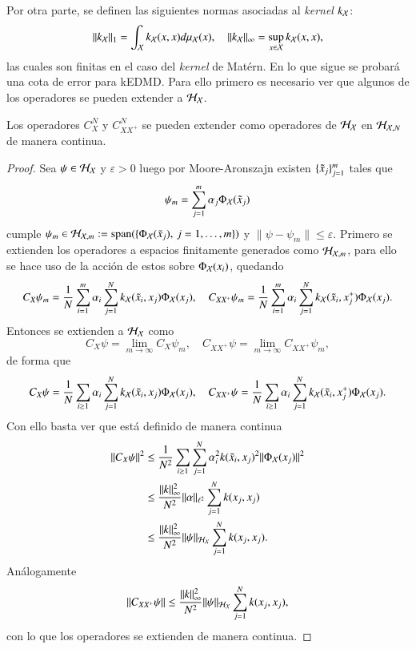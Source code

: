 Por otra parte, se definen las siguientes normas asociadas al \textit{kernel} \( k_{\mathcal{X}} \):
\begin{equation*}
    \| k_{\mathcal{X}} \|_1 = \int_{\mathcal{X}} k_{\mathcal{X}} (x,x) d \mu_{\mathcal{X}} (x), \quad \| k_{\mathcal{X}} \|_\infty = \sup_{x \in \mathcal{X}} k_{\mathcal{X}} (x,x),
\end{equation*}
las cuales son finitas en el caso del \textit{kernel} de Matérn. En lo que sigue se probará una cota de error para kEDMD. Para ello primero es necesario ver que algunos de los operadores se pueden extender a $\mathcal{H}_{\mathcal{X}}$.

\begin{prop}
    Los operadores $C_X^N$ y $C_{XX^+}^N$ se pueden extender como operadores de $\mathcal{H}_{\mathcal{X}}$ en $ \mathcal{H}_{\mathcal{X}, N}$ de manera continua.
\end{prop}

\begin{proof}
    Sea $\psi \in \mathcal{H}_{\mathcal{X}}$ y $\varepsilon > 0$ luego por Moore-Aronszajn existen $\{ \Tilde{x}_j \}_{j=1}^m$ tales que
    \[
    \psi_m = \sum_{j=1}^m \alpha_j \Phi_{\mathcal{X}} (\Tilde{x}_j)
    \]
    cumple $\psi_m \in \mathcal{H}_{\mathcal{X}, m} := \text{span}(\{ \Phi_{\mathcal{X}} (\Tilde{x}_j), \, j=1,\dots,m \})$ y $\| \psi - \psi_m \| \leq \varepsilon$. Primero se extienden los operadores a espacios finitamente generados como $\mathcal{H}_{\mathcal{X}, m}$, para ello se hace uso de la acción de estos sobre $\Phi_{\mathcal{X}} (x_i)$, quedando
    \[
    C_X \psi_m =
    \frac{1}{N} \sum_{i=1}^m \alpha_i \sum_{j = 1}^N k_{\mathcal{X}}(\Tilde{x}_i, x_j) \Phi_{\mathcal{X}} (x_j), \quad C_{XX^+} \psi_m =
    \frac{1}{N} \sum_{i=1}^m \alpha_i \sum_{j = 1}^N k_{\mathcal{X}}(\Tilde{x}_i, x_j^+) \Phi_{\mathcal{X}} (x_j).
    \]
    Entonces se extienden a $\mathcal{H}_{\mathcal{X}}$ como
    \[
    C_X \psi = \lim_{m \to \infty} C_X \psi_m, \quad C_{XX^+} \psi = \lim_{m \to \infty} C_{XX^+} \psi_m,
    \]
    de forma que
    \[
    C_X \psi =
    \frac{1}{N} \sum_{i \geq 1} \alpha_i \sum_{j = 1}^N k_{\mathcal{X}}(\Tilde{x}_i, x_j) \Phi_{\mathcal{X}} (x_j), \quad C_{XX^+} \psi =
    \frac{1}{N} \sum_{i \geq 1} \alpha_i \sum_{j = 1}^N k_{\mathcal{X}}(\Tilde{x}_i, x_j^+) \Phi_{\mathcal{X}} (x_j).
    \]
    Con ello basta ver que está definido de manera continua
    \[
    \begin{aligned}
        \| C_X \psi \|^2 & \leq \frac{1}{N^2} \sum_{i \geq 1} \sum_{j=1}^N \alpha_i^2 k(\Tilde{x}_i, x_j)^2 \| \Phi_{\mathcal{X}} (x_j) \|^2 \\
        & \leq \frac{\| k \|_\infty^2}{N^2} \| \alpha \|_{\ell^2} \sum_{j=1}^N k(x_j, x_j) \\
        & \leq \frac{\| k \|_\infty^2}{N^2} \| \psi \|_{\mathcal{H}_{\mathcal{X}}} \sum_{j=1}^N k(x_j, x_j). \\
    \end{aligned}
    \]
    Análogamente
    \[
    \| C_{XX^+} \psi \| \leq \frac{\| k \|_\infty^2}{N^2} \| \psi \|_{\mathcal{H}_{\mathcal{X}}} \sum_{j=1}^N k(x_j, x_j),
    \]
    con lo que los operadores se extienden de manera continua.
\end{proof}

